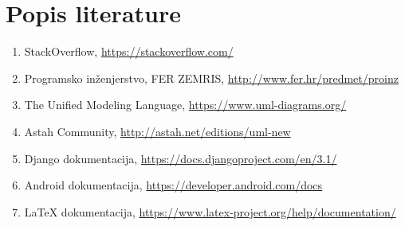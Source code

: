 \chapter*{Popis literature}
		
		
		\begin{enumerate}
			\item  StackOverflow, \url{https://stackoverflow.com/}
			
			\item  Programsko inženjerstvo, FER ZEMRIS, \url{http://www.fer.hr/predmet/proinz}
			
			\item  The Unified Modeling Language, \url{https://www.uml-diagrams.org/}
			
			\item  Astah Community, \url{http://astah.net/editions/uml-new}
			
			\item  Django dokumentacija, \url{https://docs.djangoproject.com/en/3.1/}
			
			\item  Android dokumentacija, \url{https://developer.android.com/docs}
			
			\item  LaTeX dokumentacija, \url{https://www.latex-project.org/help/documentation/}
		\end{enumerate}
		
		 
